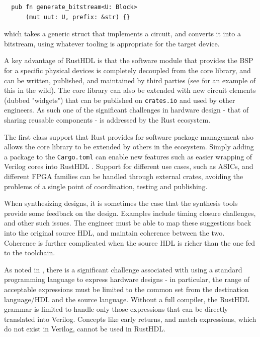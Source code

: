 \documentclass[conference]{IEEEtran}
\begin{document}
\begin{verbatim}
  pub fn generate_bitstream<U: Block>
      (mut uut: U, prefix: &str) {}
\end{verbatim}

which takes a generic struct that implements a circuit, and converts it into a bitstream, using whatever tooling is
appropriate for the target device.  

A key advantage of RustHDL is that the software module that provides the BSP for a specific physical devices is completely decoupled
from the core library, and can be written, published, and maintained by third parties (see \cite{b7} for an example of this in the wild).  
The core library can also be extended with new circuit elements (dubbed "widgets") that can be published on 
\verb|crates.io| and used by other engineers. As such one of the significant challenges in hardware design - 
that of sharing reusable components - is addressed by the Rust ecosystem.

The first class support that Rust provides for software package management also allows the core library to be extended
by others in the ecosystem.  Simply adding a package to the \verb|Cargo.toml| can enable new features such as 
easier wrapping of Verilog cores into RustHDL \cite{b8}.  Support for different use cases, such as ASICs, and different
FPGA families can be handled through external crates, avoiding the problems of a single point of coordination, testing
and publishing.

When synthesizing designs, it is sometimes the case that the synthesis tools provide some feedback on the design.
Examples include timing closure challenges, and other such issues.  The engineer must be able to map these 
suggestions back into the original source HDL, and maintain coherence between the two.  Coherence is further
complicated when the source HDL is richer than the one fed to the toolchain.  

As noted in \cite{b1}, there is a significant challenge associated with using 
a standard programming language to express hardware designs - in particular, the range of acceptable expressions
must be limited to the common set from the destination language/HDL and the source language.  Without a full compiler,
the RustHDL grammar is limited to handle only those expressions that can be directly translated into Verilog.  
Concepts like early returns, and match expressions, which do not exist in Verilog, cannot be used in RustHDL.  
\end{document}
